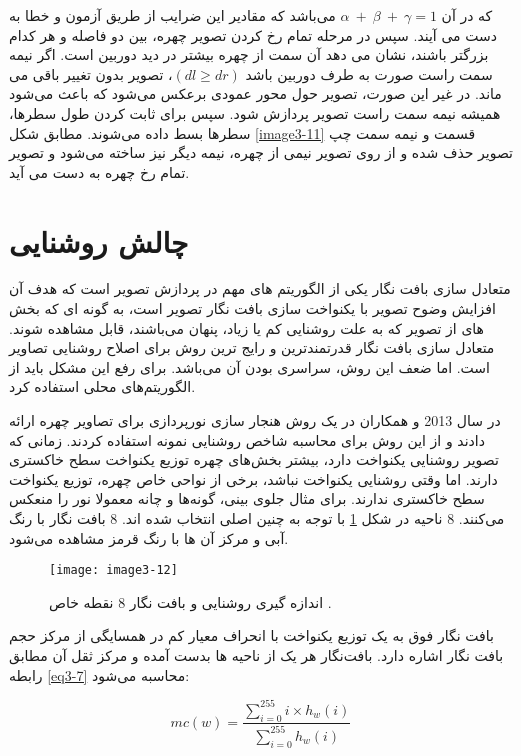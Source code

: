 \noindent‏
که در آن‏ 
$\alpha\ +\ \beta\ +\ \gamma=1	$‏
می‌باشد که مقادیر این ضرایب از طریق آزمون و خطا به دست می آیند. سپس در مرحله تمام رخ کردن تصویر چهره، بین دو فاصله  و  هر کدام بزرگتر باشند، نشان می دهد آن سمت از چهره بیشتر در دید دوربین است. اگر نیمه سمت راست صورت به طرف دوربین باشد $(dl \geq dr)$، تصویر بدون تغییر باقی می ماند. در غیر این صورت، تصویر حول محور عمودی برعکس می‌شود که باعث می‌شود همیشه نیمه سمت راست تصویر پردازش شود. سپس برای ثابت کردن طول سطرها، سطرها بسط داده می‌شوند. مطابق شکل \ref{image3-11} قسمت  و  نیمه سمت چپ تصویر حذف شده و از روی تصویر نیمی از چهره، نیمه دیگر نیز ساخته می‌شود و تصویر تمام رخ چهره به دست می آید.

\section{چالش روشنایی}
متعادل سازی بافت نگار یکی از الگوریتم های مهم در پردازش تصویر است که هدف آن افزایش وضوح تصویر با یکنواخت سازی بافت نگار تصویر است، به گونه ای که بخش های از تصویر که به علت روشنایی کم یا زیاد، پنهان می‌باشند، قابل مشاهده شوند. متعادل سازی بافت نگار قدرتمندترین و رایج ترین روش برای اصلاح روشنایی تصاویر است. اما ضعف این روش، سراسری بودن آن می‌باشد. برای رفع این مشکل باید از الگوریتم‌های محلی استفاده کرد.

\noindent
در سال 2013  و همکاران در \cite{6196234} یک روش هنجار سازی نورپردازی برای تصاویر چهره ارائه دادند و از این روش برای محاسبه شاخص روشنایی نمونه   استفاده کردند. زمانی که تصویر روشنایی یکنواخت دارد، بیشتر بخش‌های چهره توزیع یکنواخت سطح خاکستری دارند. اما وقتی روشنایی یکنواخت نباشد، برخی از نواحی خاص چهره، توزیع یکنواخت سطح خاکستری ندارند. برای مثال جلوی بینی، گونه‌ها و چانه معمولا نور را منعکس می‌کنند. 8 ناحیه در شکل \ref{image3-12} با توجه به چنین اصلی انتخاب شده اند. 8 بافت نگار با رنگ آبی و مرکز آن ها با رنگ قرمز مشاهده می‌شود.

\begin{figure}[h]
\centering
  \texttt{[image: image3-12]}
  \caption{اندازه گیری روشنایی و بافت نگار 8 نقطه خاص \cite{6196234}.}
  \label{image3-12}
\end{figure}

 بافت نگار فوق به یک توزیع یکنواخت با انحراف معیار کم در همسایگی از مرکز حجم بافت نگار اشاره دارد. بافت‌نگار هر یک از ناحیه ها بدست آمده و مرکز ثقل آن مطابق رابطه \ref{eq3-7} محاسبه می‌شود:

\begin{equation}
\label{eq3-7}
mc\left(w\right)=\frac{\sum_{i=0}^{255}{i\times h_w(i)}}{\sum_{i=0}^{255}{h_w(i)}}		
\end{equation}

